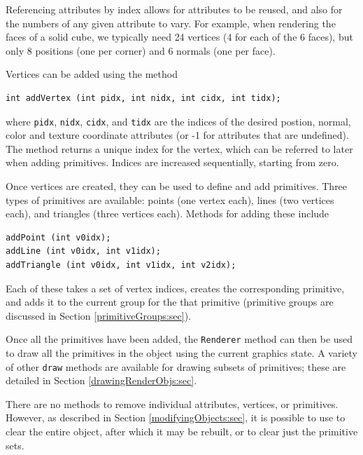 Referencing attributes by index allows for attributes to be reused,
and also for the numbers of any given attribute to vary. For example,
when rendering the faces of a solid cube, we typically need 24
vertices (4 for each of the 6 faces), but only 8 positions (one per
corner) and 6 normals (one per face). 

Vertices can be added using the 
 method
%
\begin{lstlisting}[]
int addVertex (int pidx, int nidx, int cidx, int tidx);
\end{lstlisting}
%
where {\tt pidx}, {\tt nidx}, {\tt cidx}, and {\tt tidx} are the
indices of the desired postion, normal, color and texture coordinate
attributes (or -1 for attributes that are undefined). The method
returns a unique index for the vertex, which can be referred to later
when adding primitives. Indices are increased sequentially, starting
from zero. 

Once vertices are created, they can be used to define and add
primitives. Three types of primitives are available: points (one
vertex each), lines (two vertices each), and triangles (three vertices
each). Methods for adding these include
%
\begin{lstlisting}[]
addPoint (int v0idx);
addLine (int v0idx, int v1idx);
addTriangle (int v0idx, int v1idx, int v2idx);
\end{lstlisting}
%
Each of these takes a set of vertex indices, creates the corresponding
primitive, and adds it to the current group for the that primitive
(primitive groups are discussed in Section \ref{primitiveGroups:sec}).

Once all the primitives have been added, 
the {\tt Renderer}
method  can
then be used to draw all the primitives in the object using the
current graphics state. A variety of other {\tt draw} methods are
available for drawing subsets of primitives; these are detailed in
Section \ref{drawingRenderObjs:sec}.

There are no methods to remove individual attributes, vertices, or
primitives. However, as described in Section
\ref{modifyingObjects:sec}, it is possible to use
 to clear the
entire object, after which it may be rebuilt, or
 to clear
just the primitive sets.

